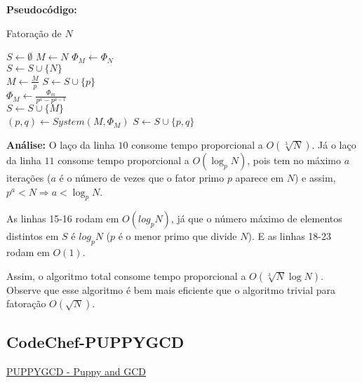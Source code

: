 \textbf{Pseudocódigo:}
\begin{algorithm}
\caption{Fatoração de $N$}
\begin{algorithmic}[1]
\State $S \gets \emptyset$ 
\State $M \gets N$
\State $\Phi_M \gets \Phi_N$
\\
 
\State $S \gets S \cup \{N\}$
\State {}
\EndIf
\\
\State $M \gets \frac{M}{p}$
\State $S \gets S \cup \{p\}$
\EndWhile
\EndFor
\\
\State $\Phi_M \gets \frac{\Phi_m}{p^a - p^{a-1}}$ 
\EndFor
\\
 
\State $S \gets S \cup \{M\}$
\State {}
\EndIf
\\
\State $(p, q) \gets System(M, \Phi_M)$ 
\State $S \gets S \cup \{p, q\}$
\State {}

\EndProcedure
\end{algorithmic}
\end{algorithm}


\textbf{Análise:}
O laço da linha $10$ consome tempo proporcional a $O(\sqrt[3]N)$. Já o laço da linha $11$ consome tempo proporcional a $O(\log_pN)$, pois tem no máximo $a$ iterações ($a$ é o número de vezes que o fator primo $p$ aparece em $N$) e assim, $p^a < N \Rightarrow a < \log_p{N}$. 

As linhas 15-16 rodam em $O(log_pN)$, já que o número máximo de elementos distintos em $S$ é $log_pN$ ($p$ é o menor primo que divide $N$).
E as linhas 18-23 rodam em $O(1)$.

Assim, o algoritmo total consome tempo proporcional a $O(\sqrt[3]N \log N)$. 
Observe que esse algoritmo é bem mais eficiente que o algoritmo trivial para fatoração $O(\sqrt N)$.


\subsection{CodeChef-PUPPYGCD}
\href{https://www.codechef.com/problems/PUPPYGCD}{PUPPYGCD - Puppy and GCD}\\


